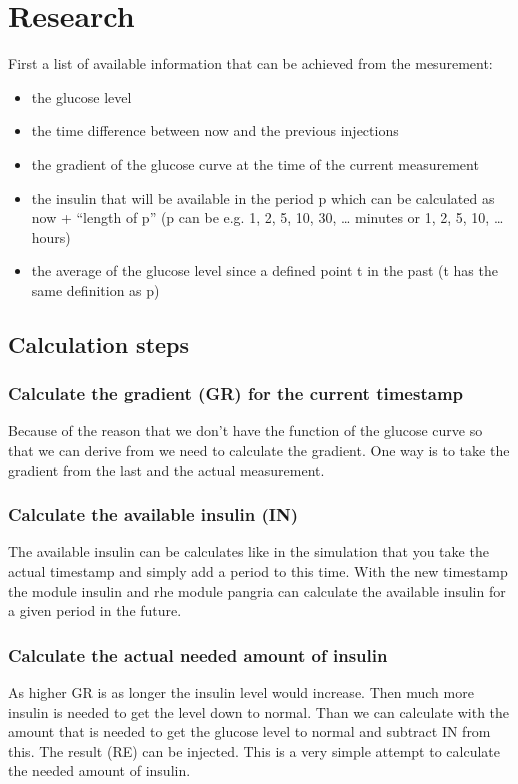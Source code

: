 \section{Research}
First a list of available information that can be achieved from the
mesurement:
\begin{itemize}
  \item the glucose level
  \item the time difference between now and the previous injections
  \item the gradient of the glucose curve at the time of the current measurement
  \item the insulin that will be available in the period p which can be
  calculated as now + ``length of p'' (p can be e.g. 1, 2, 5, 10, 30, \ldots
  minutes or 1, 2, 5, 10, \ldots hours)
  \item the average of the glucose level since a defined point t in the past (t
  has the same definition as p)
\end{itemize}

\subsection{Calculation steps}
\subsubsection{Calculate the gradient (GR) for the current timestamp}
Because of the reason that we don’t have the function of the glucose curve so
that we can derive from we need to calculate the gradient.
One way is to take the gradient from the last and the actual measurement.

\subsubsection{Calculate the available insulin (IN)}
The available insulin can be calculates like in the simulation that you take
the actual timestamp and simply add a period to this time. With the new
timestamp the module insulin and rhe module pangria can calculate the available
insulin for a given period in the future.

\subsubsection{Calculate the actual needed amount of insulin}
As higher GR is as longer the insulin level would increase. Then much more
insulin is needed to get the level down to normal. Than we can calculate with
the amount that is needed to get the glucose level to normal and subtract IN
from this. The result (RE) can be injected.
This is a very simple attempt to calculate the needed amount of insulin.

